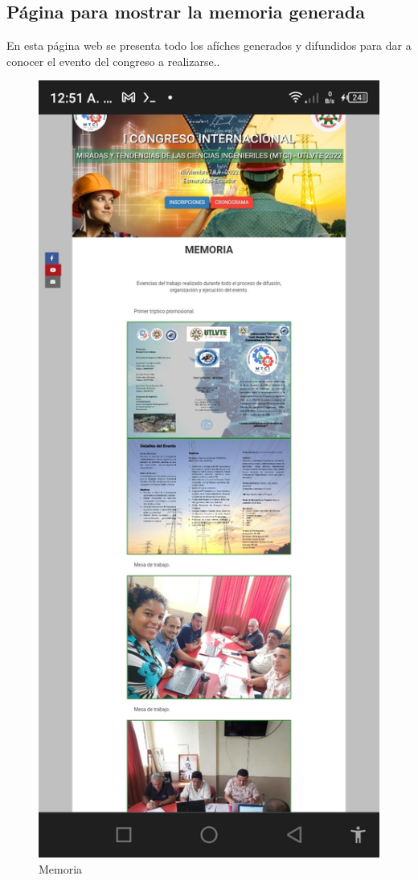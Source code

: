 \documentclass[a4paper,14px]{article}
\begin{document}
\newpage
\subsection{Página para mostrar la memoria generada}
\label{sec:pagina-principal}

En esta página web se presenta todo los afíches generados y difundidos para dar a conocer el evento del congreso a realizarse..


\begin{figure}[H]
  \centering
  \includegraphics[scale=0.3]{memoria.jpg}
  \caption{Memoria}
  \label{fig:arquitectura}
\end{figure}
\end{document}
